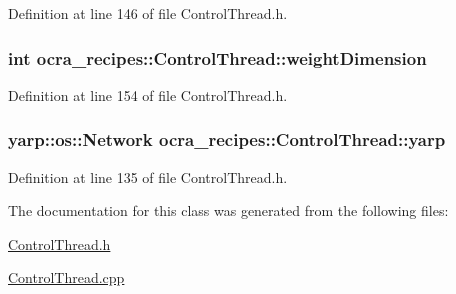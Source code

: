 Definition at line 146 of file Control\+Thread.\+h.

\subsubsection[{\texorpdfstring{weight\+Dimension}{weightDimension}}]{\setlength{\rightskip}{0pt plus 5cm}int ocra\+\_\+recipes\+::\+Control\+Thread\+::weight\+Dimension\hspace{0.3cm}{\ttfamily [protected]}}\hypertarget{classocra__recipes_1_1ControlThread_a7499733b7dd28f8ff0168e206c5b325b}{}\label{classocra__recipes_1_1ControlThread_a7499733b7dd28f8ff0168e206c5b325b}


Definition at line 154 of file Control\+Thread.\+h.

\subsubsection[{\texorpdfstring{yarp}{yarp}}]{\setlength{\rightskip}{0pt plus 5cm}yarp\+::os\+::\+Network ocra\+\_\+recipes\+::\+Control\+Thread\+::yarp\hspace{0.3cm}{\ttfamily [protected]}}\hypertarget{classocra__recipes_1_1ControlThread_ab256274135229afc7017b088424b5b3b}{}\label{classocra__recipes_1_1ControlThread_ab256274135229afc7017b088424b5b3b}


Definition at line 135 of file Control\+Thread.\+h.



The documentation for this class was generated from the following files\+:\begin{DoxyCompactItemize}
\item 
\hyperlink{ControlThread_8h}{Control\+Thread.\+h}\item 
\hyperlink{ControlThread_8cpp}{Control\+Thread.\+cpp}\end{DoxyCompactItemize}

